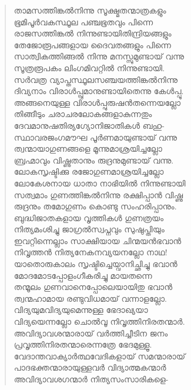\begin{verse}
താമസത്തിങ്കല്‍നിന്നു സൂക്ഷ്മതന്മാത്രകളും\\
ഭൂമിപൂര്‍വകസ്ഥൂല പഞ്ചഭൂതവും പിന്നെ\\
രാജസത്തിങ്കല്‍ നിന്നുണ്ടായിതിന്ദ്രിയങ്ങളും\\
തേജോരൂപങ്ങളായ ദൈവതങ്ങളും പിന്നെ\\
സാത്വികത്തിങ്ങല്‍ നിന്നു മനസ്സുമുണ്ടായ് വന്നു\\
സൂത്രരൂപകം ലിംഗമിവറ്റില്‍ നിന്നുണ്ടായി.\\
സര്‍വത്ര വ്യാപ്തസ്ഥൂലസഞ്ചയത്തിങ്കല്‍നിന്നു\\
ദിവ്യനാം വിരാള്‍പ്പ്രുമാനുണ്ടായിതെന്നു കേള്‍പ്പൂ.\\
അങ്ങനെയുള്ള വിരാള്‍പ്പുരുഷന്‍തന്നെയല്ലോ\\
തിങ്ങീടും ചരാചരലോകങ്ങളാകുന്നതും\\
ദേവമാനുഷതിര്യഗ്യോനിജാതികള്‍ ബഹു-\\
സ്ഥാവരജംഗമൗഘ പൂര്‍ണമായുണ്ടായ് വന്നു\\
ത്വന്മായാഗുണങ്ങളെ മൂന്നുമാശ്രയിച്ചല്ലോ\\
ബ്രഹ്മാവും വിഷ്ണുതാനും രുദ്രനുമുണ്ടായ് വന്നു.\\
ലോകസൃഷ്ടിക്കു രജോഗുണമാശ്രയിച്ചല്ലോ\\
ലോകേശനായ ധാതാ നാഭിയില്‍ നിന്നുണ്ടായി\\
സത്വമാം ഗുണത്തിങ്കല്‍നിന്നു രക്ഷിപ്പാന്‍ വിഷ്ണു\\
രുദ്രനും തമോഗുണം കൊണ്ടു സംഹരിപ്പാനും.\\
ബുദ്ധിജാതകളായ വൃത്തികള്‍ ഗുണത്രയം\\
നിത്യമംശിച്ചു ജാഗ്രല്‍സ്വപ്നവും സുഷുപ്തിയും\\
ഇവറ്റിന്നെല്ലാം സാക്ഷിയായ ചിന്മയന്‍ഭവാന്‍\\
നിവൃത്തന്‍ നിത്യനേകനവ്യയനല്ലോ നാഥ!\\
യാതൊരുകാലം സൃഷ്ടിച്ചെയ്വാനിച്ഛിച്ചു ഭവാന്‍\\
മോദമോടപ്പോളംഗീകരിച്ചു മായതന്നെ\\
തന്മൂലം ഗുണവാനെപ്പോലെയായിതു ഭവാന്‍\\
ത്വന്മഹാമായ രണ്ടുവിധമായ് വന്നാളല്ലോ.\\
വിദ്യയുമവിദ്യയുമെന്നുള്ള ഭേദാഖ്യയാ\\
വിദ്യയെന്നല്ലോ ചൊല്‍വൂ നിവൃത്തിനിരതന്മാര്‍.\\
അവിദ്യാവശന്മാരായ് വര്‍ത്തിച്ചീടിന ജനം\\
പ്രവൃത്തിനിരതന്മാരെന്നത്രേ ഭേദമുള്ളൂ.\\
വേദാന്തവാക്യാര്‍ത്ഥവേദികളായ് സമന്മാരായ്\\
പാദഭക്തന്മാരായുള്ളവര്‍ വിദ്യാത്മകന്മാര്‍\\
അവിദ്യാവശഗന്മാര്‍ നിത്യസംസാരികളെ-\\

\end{verse}
